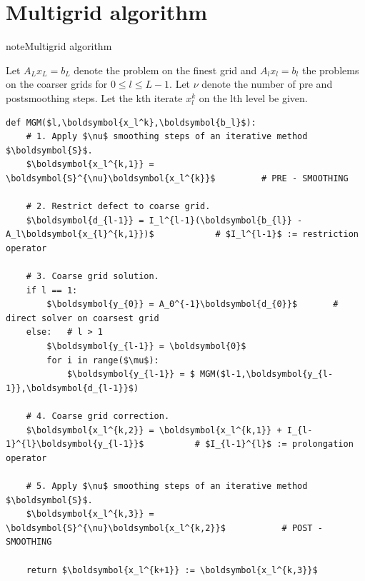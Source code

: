 \documentclass[letterpaper,10pt,english, openany]{sphinxmanual}
\begin{document}
\section{Multigrid algorithm}
\label{\detokenize{basics:multigrid-algorithm}}
\begin{sphinxadmonition}{note}{Multigrid algorithm}

Let \(A_L x_L = b_L\) denote the problem on the finest grid and \(A_l x_l = b_l\)
the problems on the coarser grids for \(0 \leq l \leq L-1\).
Let \(\nu\) denote the number of pre\sphinxhyphen{} and post\sphinxhyphen{}smoothing steps.
Let the k\sphinxhyphen{}th iterate \(x_l^k\) on the l\sphinxhyphen{}th level be given.

\lstset{language=Python}
\begin{lstlisting}[mathescape=true]
def MGM($l,\boldsymbol{x_l^k},\boldsymbol{b_l}$): 
	# 1. Apply $\nu$ smoothing steps of an iterative method $\boldsymbol{S}$.
	$\boldsymbol{x_l^{k,1}} = \boldsymbol{S}^{\nu}\boldsymbol{x_l^{k}}$			# PRE - SMOOTHING
	
	# 2. Restrict defect to coarse grid.
	$\boldsymbol{d_{l-1}} = I_l^{l-1}(\boldsymbol{b_{l}} - A_l\boldsymbol{x_{l}^{k,1}})$			# $I_l^{l-1}$ := restriction operator
	
	# 3. Coarse grid solution.
	if l == 1:
		$\boldsymbol{y_{0}} = A_0^{-1}\boldsymbol{d_{0}}$ 		# direct solver on coarsest grid
	else:	# l > 1
		$\boldsymbol{y_{l-1}} = \boldsymbol{0}$
		for i in range($\mu$):
			$\boldsymbol{y_{l-1}} = $ MGM($l-1,\boldsymbol{y_{l-1}},\boldsymbol{d_{l-1}}$)
	
	# 4. Coarse grid correction.
	$\boldsymbol{x_l^{k,2}} = \boldsymbol{x_l^{k,1}} + I_{l-1}^{l}\boldsymbol{y_{l-1}}$			 # $I_{l-1}^{l}$ := prolongation operator
	
	# 5. Apply $\nu$ smoothing steps of an iterative method $\boldsymbol{S}$.
	$\boldsymbol{x_l^{k,3}} = \boldsymbol{S}^{\nu}\boldsymbol{x_l^{k,2}}$			# POST - SMOOTHING
	
	return $\boldsymbol{x_l^{k+1}} := \boldsymbol{x_l^{k,3}}$
\end{lstlisting}
\end{sphinxadmonition}
\end{document}
